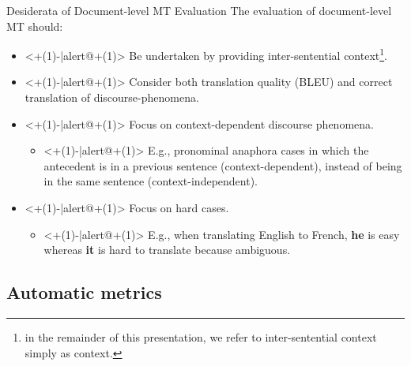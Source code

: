 \begin{frame}{Desiderata of Document-level MT Evaluation}
	The evaluation of document-level MT should:
	\begin{itemize}
		\item<+(1)-|alert@+(1)> Be undertaken by providing inter-sentential context\footnote{in the remainder of this presentation, we refer to inter-sentential context simply as context.}.
		\item<+(1)-|alert@+(1)> Consider both translation quality (BLEU) and correct translation of discourse-phenomena.
		\item<+(1)-|alert@+(1)> Focus on context-dependent discourse phenomena.
		\begin{itemize}
			\item<+(1)-|alert@+(1)> E.g., pronominal anaphora cases in which the antecedent is in a previous sentence (context-dependent), instead of being in the same sentence (context-independent).
		\end{itemize}
		\item<+(1)-|alert@+(1)> Focus on hard cases.
			\begin{itemize}
				\item<+(1)-|alert@+(1)> E.g., when translating English to French, \textbf{he} is easy whereas \textbf{it} is hard to translate because ambiguous.
			\end{itemize}
	\end{itemize} 
\end{frame}


\subsection{Automatic metrics}

